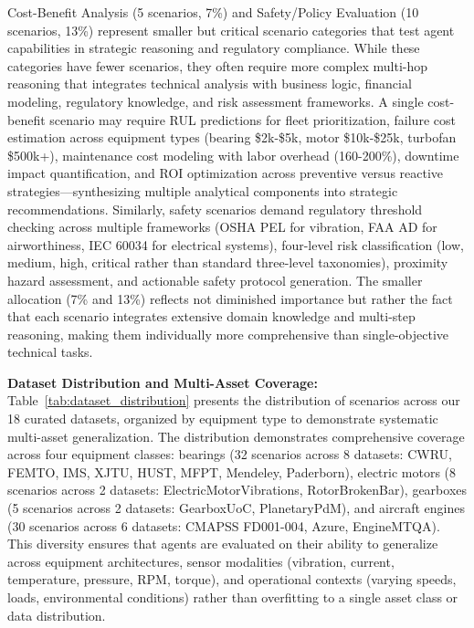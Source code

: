 \documentclass[sigconf]{acmart}
\begin{document}
Cost-Benefit Analysis (5 scenarios, 7\%) and Safety/Policy Evaluation (10 scenarios, 13\%) represent smaller but critical scenario categories that test agent capabilities in strategic reasoning and regulatory compliance. While these categories have fewer scenarios, they often require more complex multi-hop reasoning that integrates technical analysis with business logic, financial modeling, regulatory knowledge, and risk assessment frameworks. A single cost-benefit scenario may require RUL predictions for fleet prioritization, failure cost estimation across equipment types (bearing \$2k-\$5k, motor \$10k-\$25k, turbofan \$500k+), maintenance cost modeling with labor overhead (160-200\%), downtime impact quantification, and ROI optimization across preventive versus reactive strategies---synthesizing multiple analytical components into strategic recommendations. Similarly, safety scenarios demand regulatory threshold checking across multiple frameworks (OSHA PEL for vibration, FAA AD for airworthiness, IEC 60034 for electrical systems), four-level risk classification (low, medium, high, critical rather than standard three-level taxonomies), proximity hazard assessment, and actionable safety protocol generation. The smaller allocation (7\% and 13\%) reflects not diminished importance but rather the fact that each scenario integrates extensive domain knowledge and multi-step reasoning, making them individually more comprehensive than single-objective technical tasks.

\textbf{Dataset Distribution and Multi-Asset Coverage:} Table~\ref{tab:dataset_distribution} presents the distribution of scenarios across our 18 curated datasets, organized by equipment type to demonstrate systematic multi-asset generalization. The distribution demonstrates comprehensive coverage across four equipment classes: bearings (32 scenarios across 8 datasets: CWRU, FEMTO, IMS, XJTU, HUST, MFPT, Mendeley, Paderborn), electric motors (8 scenarios across 2 datasets: ElectricMotorVibrations, RotorBrokenBar), gearboxes (5 scenarios across 2 datasets: GearboxUoC, PlanetaryPdM), and aircraft engines (30 scenarios across 6 datasets: CMAPSS FD001-004, Azure, EngineMTQA). This diversity ensures that agents are evaluated on their ability to generalize across equipment architectures, sensor modalities (vibration, current, temperature, pressure, RPM, torque), and operational contexts (varying speeds, loads, environmental conditions) rather than overfitting to a single asset class or data distribution.
\end{document}
